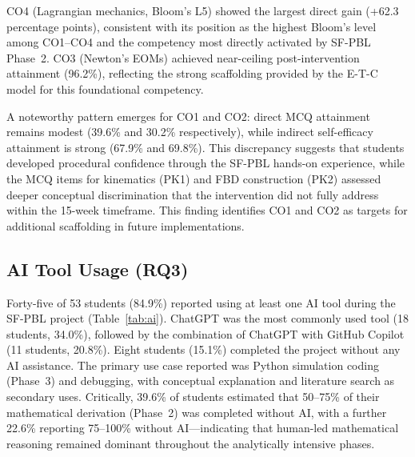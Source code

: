 \documentclass[utf8]{FrontiersinHarvard}
\begin{document}
{CO4 (Lagrangian mechanics, Bloom's L5) showed the largest direct gain
(+62.3 percentage points), consistent with its position as the highest
Bloom's level among CO1--CO4 and the competency most directly activated by
SF-PBL Phase~2. CO3 (Newton's EOMs) achieved near-ceiling post-intervention
attainment (96.2\%), reflecting the strong scaffolding provided by the E-T-C
model for this foundational competency.

A noteworthy pattern emerges for CO1 and CO2: direct MCQ attainment
remains modest (39.6\% and 30.2\% respectively), while indirect
self-efficacy attainment is strong (67.9\% and 69.8\%). This discrepancy
suggests that students developed procedural confidence through the SF-PBL
hands-on experience, while the MCQ items for kinematics (PK1) and FBD
construction (PK2) assessed deeper conceptual discrimination that the
intervention did not fully address within the 15-week timeframe. This
finding identifies CO1 and CO2 as targets for additional scaffolding in
future implementations.}

\subsection{AI Tool Usage (RQ3)}

Forty-five of 53 students (84.9\%) reported using at least one AI tool
during the SF-PBL project (Table~\ref{tab:ai}). ChatGPT was the most
commonly used tool (18 students, 34.0\%), followed by the combination of
ChatGPT with GitHub Copilot (11 students, 20.8\%). Eight students (15.1\%)
completed the project without any AI assistance. The primary use case
reported was Python simulation coding (Phase~3) and debugging, with
conceptual explanation and literature search as secondary uses. Critically,
39.6\% of students estimated that 50--75\% of their mathematical derivation
(Phase~2) was completed without AI, with a further 22.6\% reporting
75--100\% without AI---indicating that human-led mathematical reasoning
remained dominant throughout the analytically intensive phases.
\end{document}
